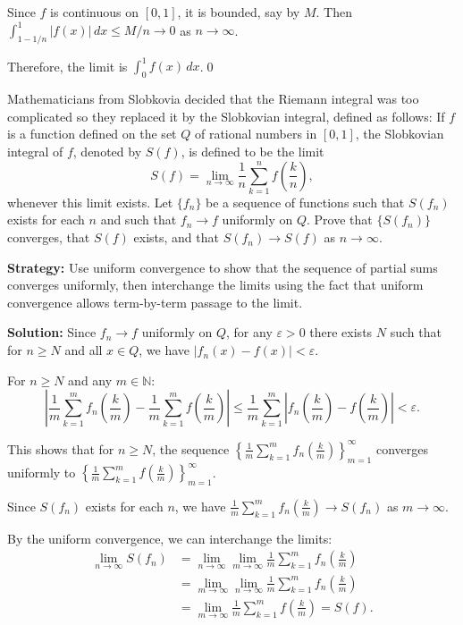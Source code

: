 Since \( f \) is continuous on \([0, 1]\), it is bounded, say by \( M \). Then \( \int_{1 - 1/n}^1 |f(x)| \, dx \leq M/n \to 0 \) as \( n \to \infty \).

Therefore, the limit is \( \int_0^1 f(x) \, dx \).\qed


\begin{problembox}
Mathematicians from Slobkovia decided that the Riemann integral was too complicated so they replaced it by the Slobkovian integral, defined as follows: If \( f \) is a function defined on the set \( Q \) of rational numbers in \([0, 1]\), the Slobkovian integral of \( f \), denoted by \( S(f) \), is defined to be the limit
\[S(f) = \lim_{n \to \infty} \frac{1}{n} \sum_{k=1}^n f \left( \frac{k}{n} \right),\]
whenever this limit exists. Let \(\{f_n\}\) be a sequence of functions such that \( S(f_n) \) exists for each \( n \) and such that \( f_n \to f \) uniformly on \( Q \). Prove that \(\{S(f_n)\}\) converges, that \( S(f) \) exists, and that \( S(f_n) \to S(f) \) as \( n \to \infty \).
\end{problembox}

\noindent\textbf{Strategy:} Use uniform convergence to show that the sequence of partial sums converges uniformly, then interchange the limits using the fact that uniform convergence allows term-by-term passage to the limit.

\bigskip\noindent\textbf{Solution:} Since \( f_n \to f \) uniformly on \( Q \), for any \( \varepsilon > 0 \) there exists \( N \) such that for \( n \geq N \) and all \( x \in Q \), we have \( |f_n(x) - f(x)| < \varepsilon \).

For \( n \geq N \) and any \( m \in \mathbb{N} \):
\[\left|\frac{1}{m} \sum_{k=1}^m f_n \left( \frac{k}{m} \right) - \frac{1}{m} \sum_{k=1}^m f \left( \frac{k}{m} \right)\right| \leq \frac{1}{m} \sum_{k=1}^m \left|f_n \left( \frac{k}{m} \right) - f \left( \frac{k}{m} \right)\right| < \varepsilon.\]

This shows that for \( n \geq N \), the sequence \( \left\{\frac{1}{m} \sum_{k=1}^m f_n \left( \frac{k}{m} \right)\right\}_{m=1}^{\infty} \) converges uniformly to \( \left\{\frac{1}{m} \sum_{k=1}^m f \left( \frac{k}{m} \right)\right\}_{m=1}^{\infty} \).

Since \( S(f_n) \) exists for each \( n \), we have \( \frac{1}{m} \sum_{k=1}^m f_n \left( \frac{k}{m} \right) \to S(f_n) \) as \( m \to \infty \).

By the uniform convergence, we can interchange the limits:
\begin{align*}
\lim_{n \to \infty} S(f_n) &= \lim_{n \to \infty} \lim_{m \to \infty} \frac{1}{m} \sum_{k=1}^m f_n \left( \frac{k}{m} \right) \\
&= \lim_{m \to \infty} \lim_{n \to \infty} \frac{1}{m} \sum_{k=1}^m f_n \left( \frac{k}{m} \right) \\
&= \lim_{m \to \infty} \frac{1}{m} \sum_{k=1}^m f \left( \frac{k}{m} \right) = S(f).
\end{align*}

